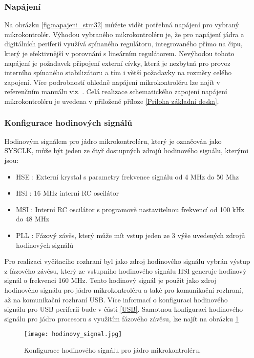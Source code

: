 	\subsubsection{Napájení}
	Na obrázku \ref{fig:napajeni_stm32} můžete vidět potřebná napájení pro vybraný mikrokontrolér. 
	Výhodou vybraného mikrokontroléru je, že pro napájení jádra a digitálních periferií využívá spínaného regulátoru, integrovaného přímo na čipu, který je efektivnější v porovnání s lineárním regulátorem. Nevýhodou tohoto napájení je požadavek připojení externí cívky, která je nezbytná pro provoz interního spínaného stabilizátoru a tím i větší požadavky na rozměry celého zapojení. Více podrobností ohledně napájení mikrokontroléru lze najít v referenčním manuálu viz. \cite{STM32U5A9_RM}. Celá realizace schematického zapojení napájení mikrokontroléru je uvedena v přiložené příloze \ref{Priloha základní deska}.
	
	\subsubsection{Konfigurace hodinových signálů} %
	Hodinovým signálem pro jádro mikrokontroléru, který je označován jako SYSCLK, může být jeden ze čtyř dostupných zdrojů hodinového signálu, kterými jsou:
	\begin{itemize}
		\setlength\itemsep{0.005em}
		\item HSE : Externí krystal s parametry frekvence signálu od 4 MHz do 50 Mhz
		\item HSI : 16 MHz interní RC oscilátor 
		\item MSI : Interní RC oscilátor s programově nastavitelnou frekvencí od 100 kHz do 48 MHz
		\item PLL : Fázový závěs, který může mít vstup jeden ze 3 výše uvedených zdrojů hodinových signálů
	\end{itemize}
	Pro realizaci vyčítacího rozhraní byl jako zdroj hodinového signálu vybrán výstup z fázového závěsu, který ze vstupního hodinového signálu HSI generuje hodinový signál o frekvenci 160 MHz. Tento hodinový signál je použit jako zdroj hodinového signálu pro jádro mikrokontroléru a také pro komunikační rozhraní, až na komunikační rozhraní USB. Více informací o konfiguraci hodinového signálu pro USB periferii bude v části \ref{USB}. Samotnou konfiguraci hodinového signálu pro jádro procesoru s využitím fázového závěsu, lze najít na obrázku \ref{fig:hodinovy_signal}
	\begin{figure}[h!]
		\centering
		\captionsetup{justification=centering}
		\texttt{[image: hodinovy\_signal.jpg]}
		\caption{Konfigurace hodinového signálu pro jádro mikrokontroléru.} 
		\label{fig:hodinovy_signal}
	\end{figure}

